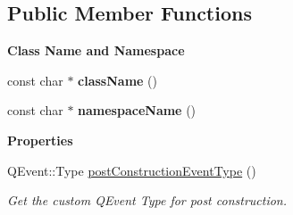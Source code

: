 \subsection*{Public Member Functions}
\begin{Indent}\textbf{ Class Name and Namespace}\par
\begin{DoxyCompactItemize}
\item 
\mbox{\label{classrev_1_1_service_manager_a06a13a7f32f50ada990875ee3ec08a9e}} 
const char $\ast$ {\bfseries class\+Name} ()
\item 
\mbox{\label{classrev_1_1_service_manager_aa77d66aeb43b2e551dc04cbff711d410}} 
const char $\ast$ {\bfseries namespace\+Name} ()
\end{DoxyCompactItemize}
\end{Indent}
\begin{Indent}\textbf{ Properties}\par
\begin{DoxyCompactItemize}
\item 
Q\+Event\+::\+Type \mbox{\hyperlink{classrev_1_1_service_manager_a46b5559f5355323714bb47b632d3bc31}{post\+Construction\+Event\+Type}} ()
\begin{DoxyCompactList}\small\item\em Get the custom Q\+Event Type for post construction. \end{DoxyCompactList}\end{DoxyCompactItemize}
\end{Indent}
